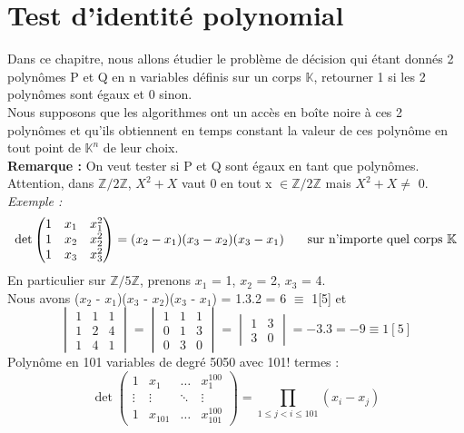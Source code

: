 \documentclass[12pt,a4paper]{article}
\newcommand\tab[1][0.65cm]{\hspace*{#1}}
\begin{document}
\section{Test d'identité polynomial}
Dans ce chapitre, nous allons étudier le problème de décision qui étant donnés 2 polynômes P et Q en n variables définis sur un corps $\mathbb{K}$, retourner 1 si les 2 polynômes sont égaux et 0 sinon.\\
Nous supposons que les algorithmes ont un accès en boîte noire à ces 2 polynômes et qu'ils obtiennent en temps constant la valeur de ces polynôme en tout point de $\mathbb{K}^n$ de leur choix.\\
\textbf{Remarque :} On veut tester si P et Q sont égaux en tant que polynômes. Attention, dans $\mathbb{Z}/2\mathbb{Z}$, $X^2+ X$ vaut 0 en tout x $\in \mathbb{Z}/2\mathbb{Z}$ mais $X^2 + X \neq$ 0.\\
\textit{Exemple :}\\
\begin{equation*}
\det
\begin{pmatrix}
1 & x_1 & x^2_1 \\
1 & x_2 & x_2^2 \\
1 & x_3 & x^2_3
\end{pmatrix} = (x_2 - x_1)(x_3 - x_2)(x_3 - x_1) \text{\tab sur n'importe quel corps $\mathbb{K}$}
\end{equation*}
En particulier sur $\mathbb{Z}/5\mathbb{Z}$, prenons $x_1$ = 1, $x_2$ = 2, $x_3$ = 4.\\
Nous avons ($x_2$ - $x_1$)($x_3$ - $x_2$)($x_3$ - $x_1$) = 1.3.2 = 6 $\equiv$ 1[5] et
\begin{equation*}
\begin{vmatrix}
1 & 1 & 1 \\
1 & 2 & 4 \\
1 & 4 & 1
\end{vmatrix} =
\begin{vmatrix}
1 & 1 & 1 \\
0 & 1 & 3 \\
0 & 3 & 0
\end{vmatrix} =
\begin{vmatrix}
1 & 3 \\
3 & 0
\end{vmatrix} = -3.3 = -9 \equiv 1[5]
\end{equation*}
Polynôme en 101 variables de degré 5050 avec 101! termes :
\begin{equation*}
\det
\begin{pmatrix}
1 & x_1 & \dots & x^{100}_1 \\
\vdots & \vdots & \ddots & \vdots \\
1 & x_{101} & \dots & x^{100}_{101}
\end{pmatrix} = \prod\limits_{1 \leq j < i \leq 101} (x_i - x_j)
\end{equation*}
\end{document}
